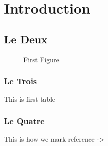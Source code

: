 \section{Introduction}
\subsection{Le Deux}
\begin{figure}[h!]
    \caption{First Figure}
\end{figure}
\subsubsection{Le Trois}
\begin{table}[h!]
    \caption{This is first table}
\end{table}
\subsubsection{Le Quatre}
This is how we mark reference ->\cite{MonkeyKing:1}
